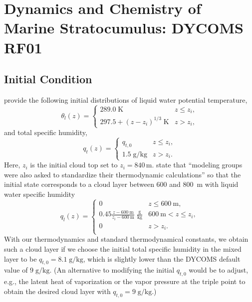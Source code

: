 \documentclass{report}
\begin{document}
\section{Dynamics and Chemistry of Marine Stratocumulus: DYCOMS RF01}

\subsection{Initial Condition}

\cite{Stevens05a} provide the following initial distributions of liquid water potential temperature,
\begin{equation}\label{eq:dycoms1}
\theta_l(z) = 
    \begin{cases}
    289.0\;\mathrm{K} & z\leq z_i,\\
    297.5 + (z - z_i)^{1/3}\;\mathrm{K}& z > z_i,
    \end{cases}
\end{equation}
and total specific humidity, 
\begin{equation}\label{eq:dycoms2}
q_t(z) = 
    \begin{cases}
    q_{t,0} & z\leq z_i,\\
    1.5\;\mathrm{g/kg} & z > z_i.
    \end{cases}
\end{equation}
Here, $z_i$ is the initial cloud top set to $z_i=840\,\mathrm{m}$. \cite{Stevens05a} state that ``modeling groups were also asked to standardize their thermodynamic calculations'' so that the initial state corresponds to a cloud layer between 600 and 800~m with liquid water specific humidity
\begin{equation}\label{eq:dycoms3}
q_l(z) = 
    \begin{cases}
    0 & z\leq 600~\mathrm{m},\\
    0.45\frac{{}z - 600~\mathrm{m}}{z_i - 600~\mathrm{m}}\;\mathrm{\frac{g}{kg}}   & 600~\mathrm{m} < z \leq z_i,\\
    0 & z > z_i.\\
    \end{cases}
\end{equation}
With our thermodynamics and standard thermodynamical constants, we obtain such a cloud layer if we choose the initial total specific humidity in the mixed layer to be $q_{t,0} = 8.1\;\mathrm{g/kg}$, which is slightly lower than the DYCOMS default value of $9\;\mathrm{g/kg}$. (An alternative to modifying the initial $q_{t,0}$ would be to adjust, e.g., the latent heat of vaporization or the vapor pressure at the triple point to obtain the desired cloud layer with $q_{t,0} = 9\;\mathrm{g/kg}$.)
\end{document}
